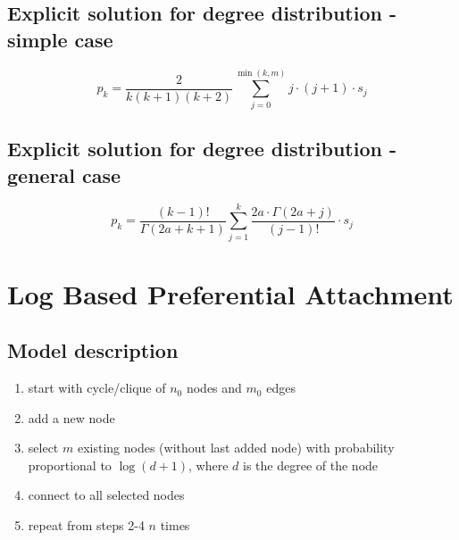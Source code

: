 \documentclass{article}
\begin{document}

\subsection*{Explicit solution for degree distribution - simple case}
\begin{equation}
    p_k = \frac{2}{k(k+1)(k+2)} \sum_{j=0}^{\min(k,m)} j \cdot (j+1) \cdot s_j
\end{equation}

\subsection*{Explicit solution for degree distribution - general case}
\begin{equation}
    p_k = \frac{(k-1)!}{\Gamma(2a+k+1)} \sum_{j=1}^{k} \frac{2a \cdot \Gamma(2a+j)}{(j-1)!} \cdot s_j
\end{equation}

\newpage

\section*{Log Based Preferential Attachment}

\subsection*{Model description}
\begin{enumerate}
    \item start with cycle/clique of $n_0$ nodes and $m_0$ edges
    \item add a new node
    \item select $m$ existing nodes (without last added node) with probability proportional to $\log(d + 1)$, where $d$ is the degree of the node
    \item connect to all selected nodes
    \item repeat from steps 2-4 $n$ times
\end{enumerate}
\end{document}
